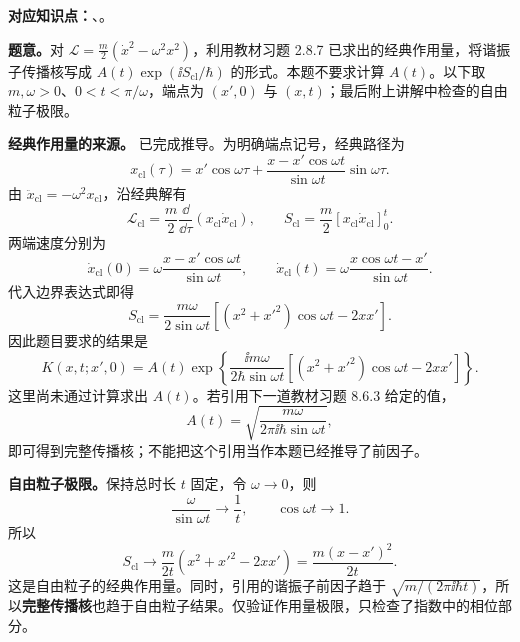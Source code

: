 \textbf{对应知识点：}、。

\textbf{题意。}对 $\mathcal L=\frac m2(\dot x^2-\omega^2x^2)$，利用教材习题 2.8.7 已求出的经典作用量，将谐振子传播核写成 $A(t)\exp(\ii S_{\mathrm{cl}}/\hbar)$ 的形式。本题不要求计算 $A(t)$。以下取 $m,\omega>0$、$0<t<\pi/\omega$，端点为 $(x',0)$ 与 $(x,t)$；最后附上讲解中检查的自由粒子极限。

\begin{checkedsolution}
\textbf{经典作用量的来源。} 已完成推导。为明确端点记号，经典路径为
\begin{equation}
  x_{\mathrm{cl}}(\tau)=x'\cos\omega\tau
    +\frac{x-x'\cos\omega t}{\sin\omega t}\sin\omega\tau.
\end{equation}
由 $\ddot x_{\mathrm{cl}}=-\omega^2x_{\mathrm{cl}}$，沿经典解有
\begin{equation}
  \mathcal L_{\mathrm{cl}}
    =\frac m2\frac{\dd}{\dd\tau}(x_{\mathrm{cl}}\dot x_{\mathrm{cl}}),
  \qquad S_{\mathrm{cl}}=\frac m2[x_{\mathrm{cl}}\dot x_{\mathrm{cl}}]_0^t.
\end{equation}
两端速度分别为
\begin{equation}
  \dot x_{\mathrm{cl}}(0)=\omega\frac{x-x'\cos\omega t}{\sin\omega t},
  \qquad
  \dot x_{\mathrm{cl}}(t)=\omega\frac{x\cos\omega t-x'}{\sin\omega t}.
\end{equation}
代入边界表达式即得
\begin{equation}
  \boxed{S_{\mathrm{cl}}=\frac{m\omega}{2\sin\omega t}
    \left[(x^2+x'^2)\cos\omega t-2xx'\right]}.
\end{equation}
因此题目要求的结果是
\begin{equation}
  \boxed{K(x,t;x',0)=A(t)\exp\!\left\{
    \frac{\ii m\omega}{2\hbar\sin\omega t}
    \left[(x^2+x'^2)\cos\omega t-2xx'\right]\right\}}.
\end{equation}
这里尚未通过计算求出 $A(t)$。若引用下一道教材习题 8.6.3 给定的值，
\begin{equation}
  A(t)=\sqrt{\frac{m\omega}{2\pi\ii\hbar\sin\omega t}},
\end{equation}
即可得到完整传播核；不能把这个引用当作本题已经推导了前因子。

\textbf{自由粒子极限。}保持总时长 $t$ 固定，令 $\omega\to0$，则
\begin{equation}
  \frac{\omega}{\sin\omega t}\longrightarrow\frac1t,
  \qquad \cos\omega t\longrightarrow1.
\end{equation}
所以
\begin{equation}
  S_{\mathrm{cl}}\longrightarrow
    \frac m{2t}(x^2+x'^2-2xx')
    =\boxed{\frac{m(x-x')^2}{2t}}.
\end{equation}
这是自由粒子的经典作用量。同时，引用的谐振子前因子趋于 $\sqrt{m/(2\pi\ii\hbar t)}$，所以\textbf{完整传播核}也趋于自由粒子结果。仅验证作用量极限，只检查了指数中的相位部分。
\end{checkedsolution}
